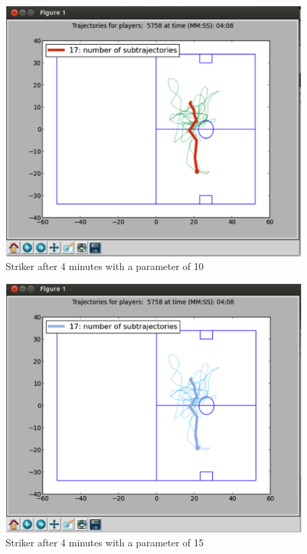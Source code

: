 \documentclass{acm_proc_article-sp-sigmod07}
\begin{document}
\begin{figure}
\includegraphics{experimental3}
\caption{Striker after 4 minutes with a parameter of 10}
\end{figure}

\begin{figure}
\includegraphics{experimental4}
\caption{Striker after 4 minutes with a parameter of 15}
\end{figure}
\end{document}
